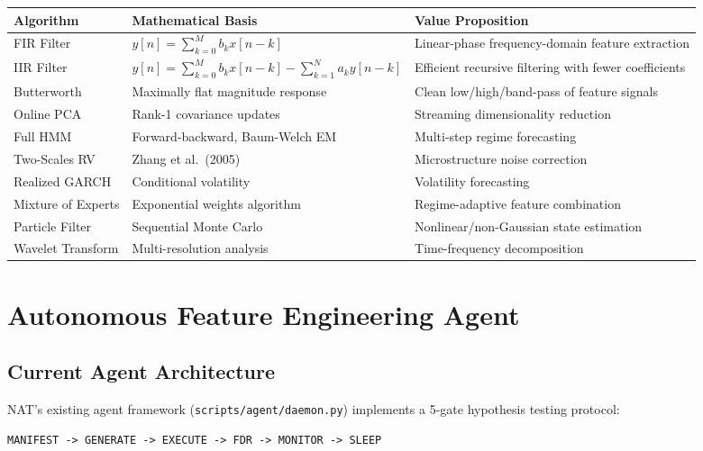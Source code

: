 \documentclass[11pt,a4paper]{article}
\begin{document}
\begin{center}
\begin{longtable}{l p{5cm} p{5cm}}
\hline
\textbf{Algorithm} & \textbf{Mathematical Basis} & \textbf{Value Proposition} \\
\hline
\endhead
FIR Filter & $y[n] = \sum_{k=0}^{M} b_k x[n-k]$ & Linear-phase frequency-domain feature extraction \\
IIR Filter & $y[n] = \sum_{k=0}^{M} b_k x[n-k] - \sum_{k=1}^{N} a_k y[n-k]$ & Efficient recursive filtering with fewer coefficients \\
Butterworth & Maximally flat magnitude response & Clean low/high/band-pass of feature signals \\
Online PCA & Rank-1 covariance updates & Streaming dimensionality reduction \\
Full HMM & Forward-backward, Baum-Welch EM & Multi-step regime forecasting \\
Two-Scales RV & Zhang et al.\ (2005) & Microstructure noise correction \\
Realized GARCH & Conditional volatility & Volatility forecasting \\
Mixture of Experts & Exponential weights algorithm & Regime-adaptive feature combination \\
Particle Filter & Sequential Monte Carlo & Nonlinear/non-Gaussian state estimation \\
Wavelet Transform & Multi-resolution analysis & Time-frequency decomposition \\
\hline
\end{longtable}
\end{center}

\newpage
\section{Autonomous Feature Engineering Agent}

\subsection{Current Agent Architecture}

NAT's existing agent framework (\texttt{scripts/agent/daemon.py}) implements a 5-gate hypothesis testing protocol:

\begin{verbatim}
MANIFEST -> GENERATE -> EXECUTE -> FDR -> MONITOR -> SLEEP
\end{verbatim}
\end{document}
